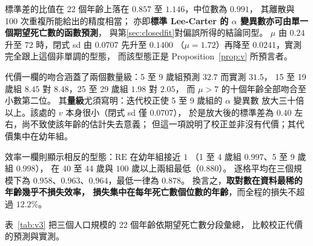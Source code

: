 \documentclass[UTF8, fontset=macnew, a4paper, 12pt]{ctexart}
\begin{document}
標準差的比值在 22 個年齡上落在 $0.857$ 至 $1.146$，中位數為 $0.991$，
其離散與 100 次重複所能給出的精度相當；
亦即\textbf{標準 Lee-Carter 的 $\alpha$ 變異數亦可由單一個期望死亡數的函數預測}，
與第\ref{sec:closedfit}對偏誤所得的結論同型。
$\mu$ 由 $0.24$ 升至 $72$ 時，閉式 sd 由 $0.0707$ 先升至 $0.1400$
（$\mu=1.72$）再降至 $0.0241$，實測完全跟上這個非單調的型態，
而該型態正是 Proposition~\ref{prop:v} 所預言者。

代價一欄的吻合涵蓋了兩個數量級：5 至 9 歲組預測 $32.7$ 而實測 $31.5$，
15 至 19 歲組 $8.45$ 對 $8.48$，25 至 29 歲組 $1.98$ 對 $2.05$，
而 $\mu>7$ 的十個年齡全部吻合至小數第二位。
其\textbf{量級}尤須寫明：迭代校正使 5 至 9 歲組的 $\alpha$ 變異數
放大三十倍以上。該處的 $v$ 本身很小（閉式 sd 僅 $0.0707$），
於是放大後的標準差為 $0.40$ 左右，尚不致使該年齡的估計失去意義；
但這一項說明了校正並非沒有代價；其代價集中在幼年組。

效率一欄則顯示相反的型態：$\mathrm{RE}$ 在幼年組接近 $1$
（1 至 4 歲組 $0.997$、5 至 9 歲組 $0.998$），
在 40 至 44 歲與 $100$ 歲以上兩組最低（$0.880$）。
逐格平均在三個規模下為 $0.958$、$0.963$、$0.964$，最低一律為 $0.878$。
換言之，\textbf{取對數在資料最稀的年齡幾乎不損失效率，
損失集中在每年死亡數個位數的年齡}，而全程的損失不超過 $12.2\%$。


表~\ref{tab:v3} 把三個人口規模的 22 個年齡依期望死亡數分段彙總，
比較校正代價的預測與實測。
\end{document}
